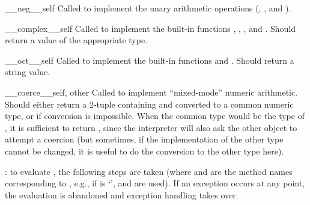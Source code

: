 \begin{methoddesc}{__neg__}{self}
Called to implement the unary arithmetic operations (\code{-},
\code{+},  and \code{\~{}}).
\end{methoddesc}

\begin{methoddesc}{__complex__}{self}
Called to implement the built-in functions
,
, ,
and .  Should return a value of
the appropriate type.
\end{methoddesc}

\begin{methoddesc}{__oct__}{self}
Called to implement the built-in functions
 and
.  Should return a string value.
\end{methoddesc}

\begin{methoddesc}{__coerce__}{self, other}
Called to implement ``mixed-mode'' numeric arithmetic.  Should either
return a 2-tuple containing  and  converted to
a common numeric type, or  if conversion is impossible.  When
the common type would be the type of , it is sufficient to
return , since the interpreter will also ask the other
object to attempt a coercion (but sometimes, if the implementation of
the other type cannot be changed, it is useful to do the conversion to
the other type here).
\end{methoddesc}

: to evaluate   , the
following steps are taken (where  and
 are the method names corresponding to
, e.g., if  is `\code{+}',  and
 are used).  If an exception occurs at any point,
the evaluation is abandoned and exception handling takes over.

